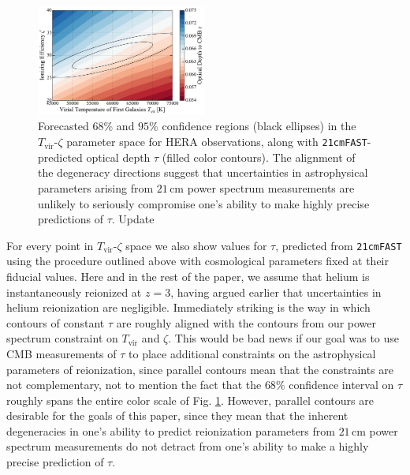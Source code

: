 \documentclass[twocolumn,aps,prd,nofootinbib,showpacs]{revtex4-1}
\begin{document}
\begin{figure}[!]
	\centering
	\includegraphics[width=0.5\textwidth]{figures/21cmDegen_wTau.pdf}
	\caption{Forecasted $68\%$ and $95\%$ confidence regions (black ellipses) in the $T_\textrm{vir}$-$\zeta$ parameter space for HERA observations, along with {\tt 21cmFAST}-predicted optical depth $\tau$ (filled color contours). The alignment of the degeneracy directions suggest that uncertainties in astrophysical parameters arising from $21\,\textrm{cm}$ power spectrum measurements are unlikely to seriously compromise one's ability to make highly precise predictions of $\tau$. \acl{Update}}
	\label{fig:21cmDegen_wTau}
\end{figure}

For every point in $T_\textrm{vir}$-$\zeta$ space we also show values for $\tau$, predicted from {\tt 21cmFAST} using the procedure outlined above with cosmological parameters fixed at their fiducial values. Here and in the rest of the paper, we assume that helium is instantaneously reionized at $z = 3$, having argued earlier that uncertainties in helium reionization are negligible. Immediately striking is the way in which contours of constant $\tau$ are roughly aligned with the contours from our power spectrum constraint on $T_\textrm{vir}$ and $\zeta$. This would be bad news if our goal was to use CMB measurements of $\tau$ to place additional constraints on the astrophysical parameters of reionization, since parallel contours mean that the constraints are not complementary, not to mention the fact that the $68\%$ confidence interval on $\tau$ roughly spans the entire color scale of Fig. \ref{fig:21cmDegen_wTau}. However, parallel contours are desirable for the goals of this paper, since they mean that the inherent degeneracies in one's ability to predict reionization parameters from $21\,\textrm{cm}$ power spectrum measurements do not detract from one's ability to make a highly precise prediction of $\tau$.
\end{document}
